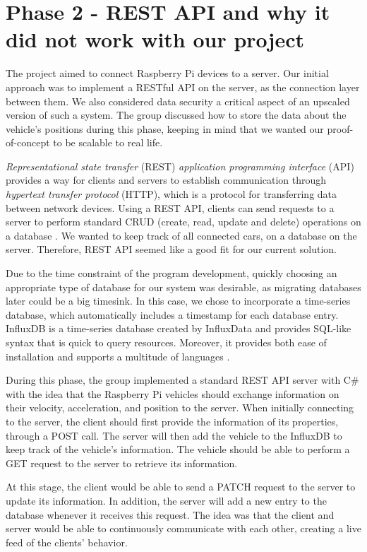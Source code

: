 
\section{Phase 2 - REST API and why it did not work with our project}\label{phase2}
The project aimed to connect Raspberry Pi devices to a server.  Our initial approach was to implement a RESTful API on the server, as the connection layer between them. We also considered data security a critical aspect of an upscaled version of such a system. The group discussed how to store the data about the vehicle's positions during this phase, keeping in mind that we wanted our proof-of-concept to be scalable to real life.

\emph{Representational state transfer} (REST) \emph{application programming interface} (API) provides a way for clients and servers to establish communication through \emph{hypertext transfer protocol} (HTTP), which is a protocol for transferring data between network devices. Using a REST API, clients can send requests to a server to perform standard CRUD (create, read, update and delete) operations on a database \parencite{rest_api}. We wanted to keep track of all connected cars, on a database on the server. Therefore, REST API seemed like a good fit for our current solution.

Due to the time constraint of the program development, quickly choosing an appropriate type of database for our system was desirable, as migrating databases later could be a big timesink. In this case, we chose to incorporate a time-series database, which automatically includes a timestamp for each database entry. InfluxDB is a time-series database created by InfluxData and provides SQL-like syntax that is quick to query resources. Moreover, it provides both ease of installation and supports a multitude of languages \parencite{influxdb}.

During this phase, the group implemented a standard REST API server with C\# with the idea that the Raspberry Pi vehicles should exchange information on their velocity, acceleration, and position to the server. When initially connecting to the server, the client should first provide the information of its properties, through a POST call. The server will then add the vehicle to the InfluxDB to keep track of the vehicle's information. The vehicle should be able to perform a GET request to the server to retrieve its information.

At this stage, the client would be able to send a PATCH request to the server to update its information. In addition, the server will add a new entry to the database whenever it receives this request. The idea was that the client and server would be able to continuously communicate with each other, creating a live feed of the clients' behavior.

